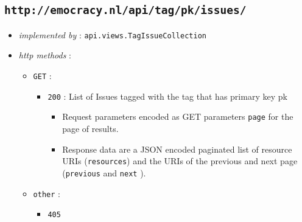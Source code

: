 \documentclass[a4paper]{report}
\begin{document}
\subsection{\texttt{http://emocracy.nl/api/tag/\textsf{pk}/issues/}}
\begin{itemize}
    \item{\textsl{implemented by} : \texttt{api.views.TagIssueCollection}}
    \item{\textsl{http methods} :
        \begin{itemize}
            \item{\texttt{GET} :
                \begin{itemize}
                    \item{\texttt{200} : List of Issues tagged with the tag that has primary key \textsf{pk}}
                    \begin{itemize}
                        \item{Request parameters encoded as GET parameters 
                        \texttt{page} for the page of results.}
                        \item{Response data are a JSON encoded paginated list of 
                        resource URIs (\texttt{resources}) and the URIs of the 
                        previous and next page (\texttt{previous} and \texttt{next}
                        ).}
                    \end{itemize}
                \end{itemize}
            }
            
            \item{\texttt{other} :
                \begin{itemize}
                    \item{\texttt{405}}
                \end{itemize}
            }
        \end{itemize}
    }
\end{itemize}
\end{document}
